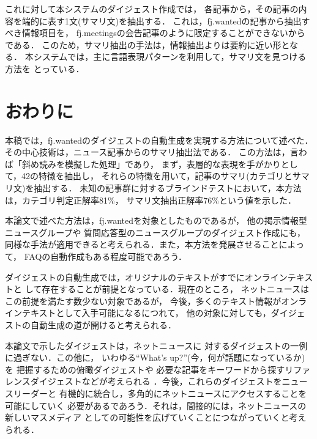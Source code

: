これに対して本システムのダイジェスト作成では，
各記事から，その記事の内容を端的に表す1文(サマリ文)を抽出する．
これは，fj.wantedの記事から抽出すべき情報項目を，
fj.meetingsの会告記事のように限定することができないからである．
このため，サマリ抽出の手法は，情報抽出よりは要約に近い形となる．
本システムでは，主に言語表現パターンを利用して，サマリ文を見つける方法を
とっている．

\section{おわりに}

本稿では，fj.wantedのダイジェストの自動生成を実現する方法について述べた．
その中心技術は，ニュース記事からのサマリ抽出法である．
この方法は，言わば「斜め読みを模擬した処理」であり，
まず，表層的な表現を手がかりとして，42の特徴を抽出し，
それらの特徴を用いて，記事のサマリ(カテゴリとサマリ文)を抽出する．
未知の記事群に対するブラインドテストにおいて，本方法は，カテゴリ判定正解率81\%，
サマリ文抽出正解率76\%という値を示した．

本論文で述べた方法は，fj.wantedを対象としたものであるが，
他の掲示情報型ニュースグループや
質問応答型のニュースグループのダイジェスト作成にも，
同様な手法が適用できると考えられる．また，本方法を発展させることによって，
FAQの自動作成もある程度可能であろう．

ダイジェストの自動生成では，オリジナルのテキストがすでにオンラインテキストと
して存在することが前提となっている．現在のところ，
ネットニュースはこの前提を満たす数少ない対象であるが，
今後，多くのテキスト情報がオンラインテキストとして入手可能になるにつれて，
他の対象に対しても，ダイジェストの自動生成の道が開けると考えられる．

本論文で示したダイジェストは，ネットニュースに
対するダイジェストの一例に過ぎない．この他に，
いわゆる``What's up?''(今，何が話題になっているか)を
把握するための俯瞰ダイジェストや
必要な記事をキーワードから探すリファレンスダイジェストなどが考えられる
\cite{Madoka-master-94}．今後，これらのダイジェストをニュースリーダーと
有機的に統合し，多角的にネットニュースにアクセスすることを可能にしていく
必要があるであろう．それは，間接的には，ネットニュースの新しいマスメディア
としての可能性を広げていくことにつながっていくと考えられる．


\newpage



\begin{biography}


\end{biography}


